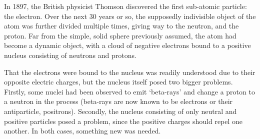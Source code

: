 In 1897, the British physicist Thomson discovered the first sub-atomic particle: the electron.
Over the next 30 years or so, the supposedly indivisible object of the atom was further divided multiple times, giving way to the neutron, and the proton.
Far from the simple, solid sphere previously assumed, the atom had become a dynamic object, with a cloud of negative electrons bound to a positive nucleus consisting of neutrons and protons.

That the electrons were bound to the nucleus was readily understood due to their opposite electric charges, but the nucleus itself posed two bigger problems.
Firstly, some nuclei had been observed to emit `beta-rays' and change a proton to a neutron in the process (beta-rays are now known to be electrons or their antiparticle, positrons).
Secondly, the nucleus consisting of only neutral and positive particles posed a problem, since the positive charges should repel one another.
In both cases, something new was needed.

